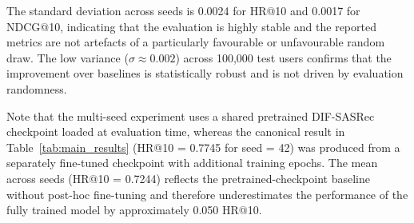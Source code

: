 The standard deviation across seeds is 0.0024 for HR@10 and 0.0017 for NDCG@10, indicating that the evaluation is highly stable and the reported metrics are not artefacts of a particularly favourable or unfavourable random draw.
The low variance ($\sigma \approx 0.002$) across 100{,}000 test users confirms that the improvement over baselines is statistically robust and is not driven by evaluation randomness.

Note that the multi-seed experiment uses a shared pretrained DIF-SASRec checkpoint loaded at evaluation time, whereas the canonical result in Table~\ref{tab:main_results} (HR@10 = 0.7745 for seed = 42) was produced from a separately fine-tuned checkpoint with additional training epochs.
The mean across seeds (HR@10 = 0.7244) reflects the pretrained-checkpoint baseline without post-hoc fine-tuning and therefore underestimates the performance of the fully trained model by approximately 0.050 HR@10.
